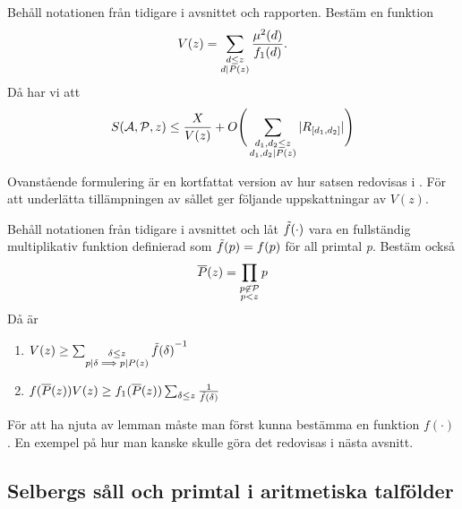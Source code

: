 \begin{theorem}\label{thm:SelbergSieve} Behåll notationen från tidigare i avsnittet och rapporten. Bestäm en funktion
\begin{equation}
    V(z) = \sum_{\substack{d\leq z\\ d\divides P(z)}}\frac{\mu^2(d)}{f_1(d)}.\nonumber
\end{equation}
Då har vi att
\begin{equation}
    \S{A}{P}{z} \leq \frac{X}{V(z)} + O\Bigg(\sum_{\substack{d_1,d_2\leq z\\d_1,d_2\divides P(z)}}|R_{[d_1, d_2]}|\Bigg)\nonumber
\end{equation}
\end{theorem}
Ovanstående formulering är en kortfattat version av hur satsen redovisas i \cite{cojocarumurty}. För att underlätta tillämpningen av sållet ger \cite{cojocarumurty} följande uppskattningar av \(V(z)\).
\begin{lemma}[Uppskattningar av \(V(z)\)]\label{thm:SelVApp}
Behåll notationen från tidigare i avsnittet och låt \(\Tilde{f}(\cdot)\) vara en fullständig multiplikativ funktion definierad som \(\Tilde{f}(p) = f(p)\) för all primtal \textit{p}. Bestäm också
\begin{equation}
    \overline{P}(z) = \prod_{\substack{p\not\in\P\\p<z}} p\nonumber
\end{equation}
Då är
\begin{enumerate}
    \item \(
         V(z) \geq \sum_{\substack{\delta\leq z\\p\divides\delta\implies p\divides P(z)}} {\Tilde{f}(\delta)}^{-1}\nonumber\)
    \item \(
        f(\overline{P}(z))V(z) \geq f_1(\overline{P}(z))\sum_{\delta \leq z}\frac{1}{\Tilde{f}(\delta)}\nonumber
    \)
\end{enumerate}
\end{lemma}
För att ha njuta av lemman måste man först kunna bestämma en funktion \(f(\cdot)\). En exempel på hur man kanske skulle göra det redovisas i nästa avsnitt.
\subsection{Selbergs såll och primtal i aritmetiska talfölder}